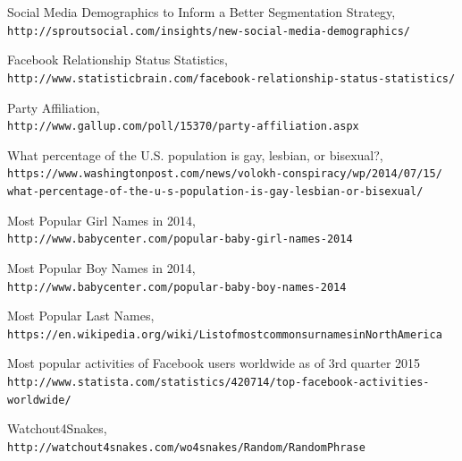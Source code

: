 \documentclass{article}
\begin{document}
\begin{thebibliography}{99}

Social Media Demographics to Inform a Better Segmentation Strategy,
\\\texttt{http://sproutsocial.com/insights/new-social-media-demographics/}

Facebook Relationship Status Statistics,
\\\texttt{http://www.statisticbrain.com/facebook-relationship-status-statistics/}

Party Affiliation,
\\\texttt{http://www.gallup.com/poll/15370/party-affiliation.aspx}

What percentage of the U.S. population is gay, lesbian, or bisexual?,
\\\texttt{https://www.washingtonpost.com/news/volokh-conspiracy/wp/2014/07/15/
what-percentage-of-the-u-s-population-is-gay-lesbian-or-bisexual/}

Most Popular Girl Names in 2014,
\\\texttt{http://www.babycenter.com/popular-baby-girl-names-2014}

Most Popular Boy Names in 2014,
\\\texttt{http://www.babycenter.com/popular-baby-boy-names-2014}

Most Popular Last Names,
\\\texttt{https://en.wikipedia.org/wiki/ListofmostcommonsurnamesinNorthAmerica}

Most popular activities of Facebook users worldwide as of 3rd quarter 2015
\\\texttt{http://www.statista.com/statistics/420714/top-facebook-activities-worldwide/}

Watchout4Snakes,
\\\texttt{http://watchout4snakes.com/wo4snakes/Random/RandomPhrase}

\end{thebibliography}
\end{document}

